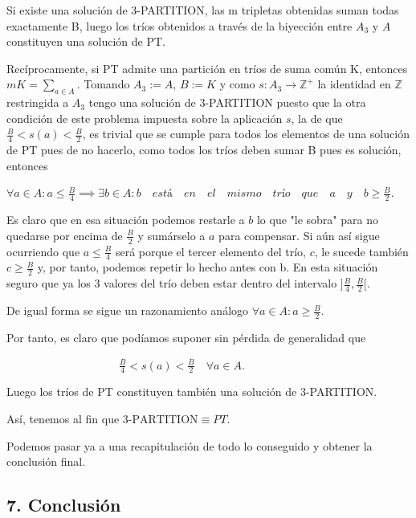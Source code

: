 \documentclass{article}
\begin{document}
Si existe una solución de 3-PARTITION, las m tripletas obtenidas suman todas exactamente B, luego los tríos obtenidos a través de la biyección entre $A_3$ y $A$ constituyen una solución de PT.


\vspace{1\baselineskip}
Recíprocamente, si PT admite una partición en tríos de suma común K, entonces $mK=\sum_{a\in A}$. Tomando $A_3 := A$, $B := K$  y como $s : A_3 \to \mathbb{Z}^+$ la identidad en $\mathbb{Z}$ restringida a $A_3$ tengo una solución de 3-PARTITION puesto que la otra condición de este problema impuesta sobre la aplicación $s$, la de que $\frac{B}{4} < s(a) < \frac{B}{2}$, es trivial que se cumple para todos los elementos  de una solución de PT pues de no hacerlo, como todos los tríos deben sumar B pues es solución, entonces

\vspace{1\baselineskip}
$\forall a \in A : a \le \frac{B}{4} \implies \exists b \in A : b \quad está \quad en \quad el \quad mismo \quad trío \quad que \quad a \quad y \quad b \ge \frac{B}{2}.$ 

\vspace{1\baselineskip}
Es claro que en esa situación podemos restarle a $b$ lo que "le sobra" para no quedarse por encima de $\frac{B}{2}$ y sumárselo a $a$ para compensar. Si aún así sigue ocurriendo que $a \le \frac{B}{4}$ será porque el tercer elemento del trío, $c$, le sucede también $c \ge \frac{B}{2}$ y, por tanto, podemos repetir lo hecho antes con b. En esta situación seguro que ya los 3 valores del trío deben estar dentro del intervalo $]\frac{B}{4}, \frac{B}{2}[$.

De igual forma se sigue un razonamiento análogo $\forall a \in A : a \ge \frac{B}{2}$.

Por tanto, es claro que podíamos suponer sin pérdida de generalidad que 

$ \quad \quad \quad \quad \quad \quad \quad \quad \quad \quad\frac{B}{4} < s(a) < \frac{B}{2} \quad \forall a \in A$.

\vspace{1\baselineskip}
Luego los tríos de PT constituyen también una solución de 3-PARTITION.

Así, tenemos al fin que $3\text{-PARTITION}
\equiv
PT$.

\vspace{1\baselineskip}
Podemos pasar ya a una recapitulación de todo lo conseguido y obtener la conclusión final.

\subsection*{7. Conclusión}
\end{document}
